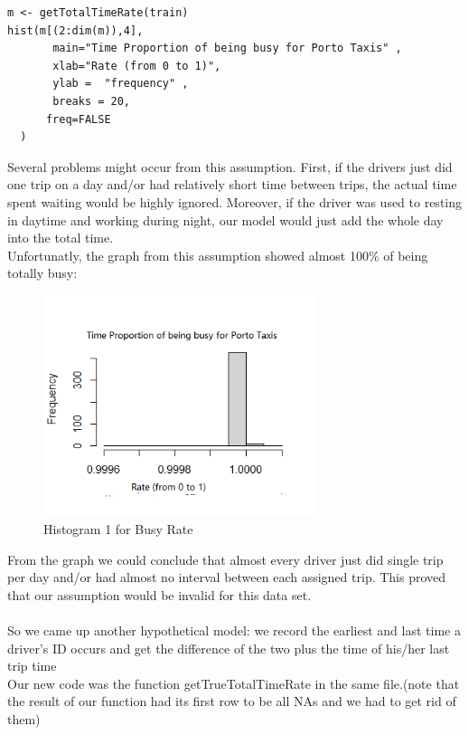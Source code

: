 \documentclass[letterpaper, 12 pt, conference]{article}
\begin{document}
\begin{enumerate}
\begin{lstlisting}
m <- getTotalTimeRate(train)
hist(m[(2:dim(m)),4],
       main="Time Proportion of being busy for Porto Taxis" ,
       xlab="Rate (from 0 to 1)",
       ylab =  "frequency" ,
       breaks = 20,
      freq=FALSE
  )
    \end{lstlisting}
    Several problems might occur from this assumption. First, if the drivers just did one trip on a day and/or had relatively short time between trips, the actual time spent waiting would be highly ignored. Moreover, if the driver was used to resting in daytime and working during night, our model would just add the whole day into the total time.
    \\Unfortunatly, the graph from this assumption showed almost 100\% of being totally busy:
    \begin{figure}[H]
    \centering
    \includegraphics[width=8cm]{B2Hist1.jpg}
    \caption{Histogram 1 for Busy Rate }
    \label{fig:b2hist1}
    \end{figure}
    From the graph we could conclude that almost every driver just did single trip per day and/or had almost no interval between each assigned trip. This proved that our assumption would be invalid for this data set.
    \\
    \\So we came up another hypothetical model: we record the earliest and last time a driver's ID occurs and get the difference of the two plus the time of his/her last trip time 
    \\Our new code was the function getTrueTotalTimeRate in the same file.(note that the result of our function had its first row to be all NAs and we had to get rid of them)
    \begin{lstlisting}


\end{lstlisting}
\end{enumerate}
\end{document}
